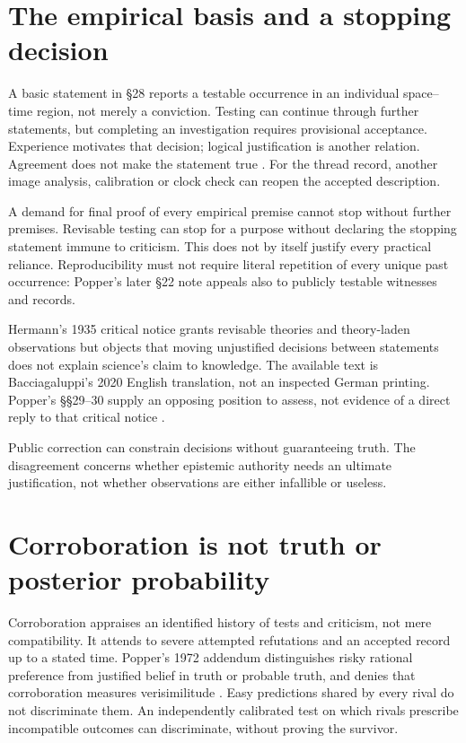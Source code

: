 \section{The empirical basis and a stopping decision}
\label{sec:p15-popper-basic-statements}

A basic statement in \S28 reports a testable occurrence in an
individual space--time region, not merely a conviction.
Testing can continue through further statements, but completing
an investigation requires provisional acceptance. Experience
motivates that decision; logical justification is another relation.
Agreement does not make the statement true
\parencite[\S\S25--30]{Popper2002LogicDiscoveryUI}.
For the thread record, another image analysis, calibration or
clock check can reopen the accepted description.

A demand for final proof of every empirical premise cannot stop
without further premises. Revisable testing can stop for a purpose
without declaring the stopping statement immune to criticism.
This does not by itself justify every practical reliance.
Reproducibility must not require literal repetition of every unique
past occurrence: Popper's later \S22 note appeals also to publicly
testable witnesses and records.

Hermann's 1935 critical notice grants revisable theories and theory-laden
observations but objects that moving unjustified decisions between
statements does not explain science's claim to knowledge.
The available text is Bacciagaluppi's 2020 English translation,
not an inspected German printing. Popper's \S\S29--30 supply
an opposing position to assess, not evidence of a direct reply
to that critical notice \parencite[pp.~621--623]{Hermann2020PopperReview}.

Public correction can constrain decisions without guaranteeing truth.
The disagreement concerns whether epistemic authority needs an
ultimate justification, not whether observations are either
infallible or useless.

\section{Corroboration is not truth or posterior probability}
\label{sec:p15-popper-corroboration}

Corroboration appraises an identified history of tests and criticism,
not mere compatibility. It attends to severe attempted refutations
and an accepted record up to a stated time. Popper's 1972 addendum
distinguishes risky rational preference from justified belief in
truth or probable truth, and denies that corroboration measures
verisimilitude \parencite[\S\S82--85]{Popper2002LogicDiscoveryUI}.
Easy predictions shared by every rival do not discriminate them.
An independently calibrated test on which rivals prescribe
incompatible outcomes can discriminate, without proving the survivor.

